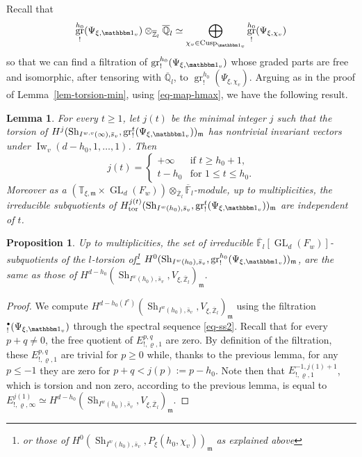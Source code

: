 \documentclass[JEP,XML,SOM,Unicode,published]{cedram}
\let\mathds\mathbbm
\newcommand{\NoChangel}[1]{%
\expandafter\let\csname old\string#1\endcsname=#1
\let#1=\relax
\newcommand{#1}{\mathcode`l="716C\csname old\string#1\endcsname\mathcode`l="7160 }%
}
\newcommand{\sbullet}{{\scriptscriptstyle\bullet}}
\newcommand{\csbullet}{{\raisebox{1pt}{$\sbullet$}}}
\DeclareMathOperator{\GL}{GL}
\newcommand{\tor}{\mathrm{tor}}
\theoremstyle{plain}
\newtheorem{lemma}[equation]{Lemma}
\newtheorem{prop}[equation]{Proposition}
\theoremstyle{definition}
\numberwithin{equation}{subsection}
\newcommand\Tm{{\mathbb T}}
\newcommand\Fm{{\mathbb F}}
\newcommand\Qm{{\mathbb Q}}
\newcommand\Zm{{\mathbb Z}}
\DeclareMathOperator{\sh}{Sh}
\DeclareMathOperator{\cusp}{Cusp}
\DeclareMathOperator{\Iw}{Iw}
\DeclareMathOperator{\gr}{gr}
\DeclareMathOperator{\Fil}{Fil}\NoChangel{\Fil}
\let \oo=\infty
\begin{document}
Recall that
\[
\gr^{h_0}_!(\Psi_{\xi,\mathds 1_v}) \otimes_{\overline \Zm_l} \overline \Qm_l \simeq
\bigoplus_{\chi_v \in \cusp_{\mathds 1_v}} \gr^{h_0}_{!}(\Psi_{\xi,\chi_v})
\]
so that we can find a filtration of $\gr^{h_0}_!(\Psi_{\xi,\mathds 1_v})$ whose graded parts are
free and isomorphic, after tensoring with $\overline \Qm_l$, to
$\gr^{h_0}_{!}(\Psi_{\xi,\chi_v})$.
Arguing as in the proof of Lemma~\ref{lem-torsion-min}, using \eqref{eq-map-hmax},
we have the following result.

\begin{lemma} \label{lem-important2}
For every $t\geq1$, let $j(t)$ be the minimal integer $j$ such that the torsion of
$H^j(\sh_{I^{w,v}(\oo),\bar s_v},\gr^t_{!}(\Psi_{\xi,\mathds 1_v}))_{\mathfrak m}$ has
nontrivial invariant vectors under $\Iw_v(d-h_0,1,\dots,1)$. Then
\[
j(t)=\begin{cases}
+ \oo & \text{if } t \geq h_0+1, \\
t-h_0 & \text{for } 1 \leq t \leq h_0.
\end{cases}
\]
Moreover as a $(\Tm_{\xi,\mathfrak m} \times \GL_d(F_w)) \otimes_{\overline \Zm_l} \overline \Fm_l$-module,
up to multiplicities, the irreducible subquotients of
$H_{\tor}^{j(t)}(\sh_{I^{w}(h_0),\bar s_v},\gr^t_{!}
(\Psi_{\xi,\mathds 1_v}))_{\mathfrak m}$ are
independent of $t$.
\end{lemma}

\begin{prop} \label{prop-important}
Up to multiplicities, the set of irreducible
$\overline \Fm_l[\GL_d(F_w)]$-subquotients of the $l$-torsion of\footnote{or
those of $H^{0}(\sh_{I^w(h_0),\bar s_v},P_\xi(h_0,\chi_v))_{\mathfrak m}$
as explained above}
$H^{0}(\sh_{I^w(h_0),\bar s_v},\gr^{h_0}_{!}(\Psi_{\xi,\mathds 1_v}))_{\mathfrak m}$,
are the same as those of
$H^{d-h_0}(\sh_{I^w(h_0),\bar s_v},V_{\xi,\overline \Zm_l})_{\mathfrak m}$.
\end{prop}

\begin{proof}
We compute $H^{d-h_0(I^v)}(\sh_{I^w(h_0),\bar s_v},V_{\xi,\overline \Zm_l})_{\mathfrak m}$
using the filtration $\Fil^{\csbullet}_!(\Psi_{\xi,\mathds 1_v})$ through the spectral sequence
\eqref{eq-ss2}. Recall that for every $p+q \neq 0$, the free quotient of $E^{p,q}_{!,\varrho,1}$
are zero. By definition of the filtration, these $E^{p,q}_{!,\varrho,1}$ are trivial for $p \geq 0$
while, thanks to the previous lemma, for any $p \leq -1$ they are zero for
$p+q < j(p):=p-h_0$. Note then that
$E_{!,\varrho,1}^{-1,j(1)+1}$, which is torsion and non zero, according to the previous lemma,
is equal to $E_{!,\varrho,\oo}^{j(1)} \simeq
H^{d-h_0}(\sh_{I^w(h_0),\bar s_v},V_{\xi,\overline \Zm_l})_{\mathfrak m}$.
\end{proof}
\end{document}
